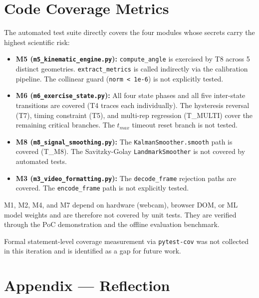 \documentclass[12pt, titlepage]{article}
\begin{document}
\section{Code Coverage Metrics}
\label{sec:coverage}

The automated test suite directly covers the four modules whose secrets carry
the highest scientific risk:

\begin{itemize}

  \item \textbf{M5 (\texttt{m5\_kinematic\_engine.py}):}
    \texttt{compute\_angle} is exercised by T8 across 5 distinct geometries.
    \texttt{extract\_metrics} is called indirectly via the calibration
    pipeline. The collinear guard (\texttt{norm < 1e-6}) is not explicitly
    tested.

  \item \textbf{M6 (\texttt{m6\_exercise\_state.py}):}
    All four state phases and all five inter-state transitions are covered
    (T4 traces each individually). The hysteresis reversal (T7), timing
    constraint (T5), and multi-rep regression (T\_MULTI) cover the remaining
    critical branches. The $t_{max}$ timeout reset branch is not tested.

  \item \textbf{M8 (\texttt{m8\_signal\_smoothing.py}):}
    The \texttt{KalmanSmoother.smooth} path is covered (T\_M8).
    The Savitzky-Golay \texttt{LandmarkSmoother} is not covered by automated
    tests.

  \item \textbf{M3 (\texttt{m3\_video\_formatting.py}):}
    The \texttt{decode\_frame} rejection paths are covered. The
    \texttt{encode\_frame} path is not explicitly tested.

\end{itemize}

M1, M2, M4, and M7 depend on hardware (webcam), browser DOM, or ML model
weights and are therefore not covered by unit tests. They are verified through
the PoC demonstration and the offline evaluation benchmark.

Formal statement-level coverage measurement via \texttt{pytest-cov} was not
collected in this iteration and is identified as a gap for future work.





\newpage{}
\section*{Appendix --- Reflection}
\end{document}
